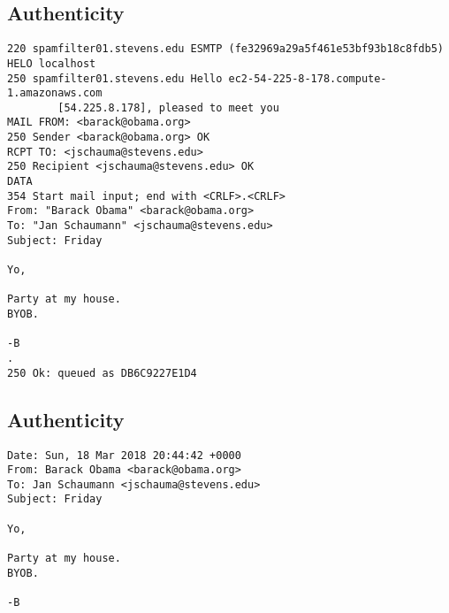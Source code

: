 \documentclass[xga]{xdvislides}
\begin{document}
\subsection{Authenticity}
\smallish
\begin{verbatim}
220 spamfilter01.stevens.edu ESMTP (fe32969a29a5f461e53bf93b18c8fdb5)
HELO localhost
250 spamfilter01.stevens.edu Hello ec2-54-225-8-178.compute-1.amazonaws.com
        [54.225.8.178], pleased to meet you
MAIL FROM: <barack@obama.org>
250 Sender <barack@obama.org> OK
RCPT TO: <jschauma@stevens.edu>
250 Recipient <jschauma@stevens.edu> OK
DATA
354 Start mail input; end with <CRLF>.<CRLF>
From: "Barack Obama" <barack@obama.org>
To: "Jan Schaumann" <jschauma@stevens.edu>
Subject: Friday

Yo,

Party at my house.
BYOB.

-B
.
250 Ok: queued as DB6C9227E1D4
\end{verbatim}
\Normalsize

\subsection{Authenticity}
\begin{verbatim}
Date: Sun, 18 Mar 2018 20:44:42 +0000
From: Barack Obama <barack@obama.org>
To: Jan Schaumann <jschauma@stevens.edu>
Subject: Friday

Yo,

Party at my house.
BYOB.

-B
\end{verbatim}
\end{document}
